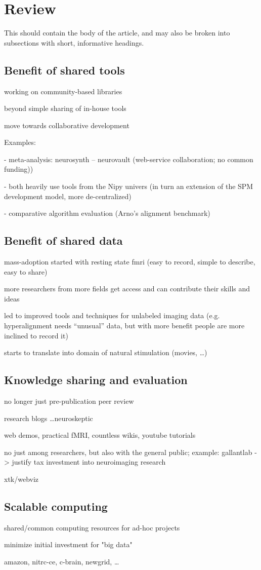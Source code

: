 \section{Review}

This should contain the body of the article, and may also be broken into subsections with short, informative headings.

\subsection{Benefit of shared tools}

working on community-based libraries

beyond simple sharing of in-house tools

move towards collaborative development

Examples:

- meta-analysis: neurosynth -- neurovault (web-service collaboration; no common funding))

- both heavily use tools from the Nipy univers (in turn an extension of the SPM
  development model, more de-centralized)

- comparative algorithm evaluation (Arno's alignment benchmark)

\subsection{Benefit of shared data}

mass-adoption started with resting state fmri (easy to record, simple to describe, easy to share)

more researchers from more fields get access and can contribute their skills and ideas

led to improved tools and techniques for unlabeled imaging data
(e.g. hyperalignment needs ``unusual'' data, but with more benefit people are more inclined to record it)

starts to translate into domain of natural stimulation (movies, \ldots)

\subsection{Knowledge sharing and evaluation}

no longer just pre-publication peer review

research blogs \ldots neuroskeptic

web demos, practical fMRI, countless wikis, youtube tutorials

no just among researchers, but also with the general public;
example: gallantlab -> justify tax investment into neuroimaging research

xtk/webviz

\subsection{Scalable computing}

shared/common computing resources for ad-hoc projects

minimize initial investment for "big data"

amazon, nitrc-ce, c-brain, newgrid, \ldots
